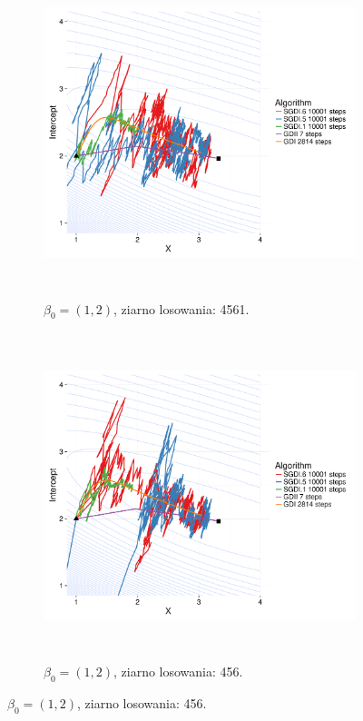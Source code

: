 \begin{figure}[hbt!]
  \begin{center}
   \begin{subfigure}[h!]{0.9\textwidth}
      \includegraphics[width=\textwidth, height=270pt]{Obrazki/Numeryka/sgd_1_2_1.pdf}
      \caption{$\beta_0 = (1,2)$, ziarno losowania: 4561.}
   \end{subfigure}     
   \begin{subfigure}[h!]{0.9\textwidth}
      \includegraphics[width=\textwidth, height=270pt]{Obrazki/Numeryka/sgd_1_2_2.pdf}
      \caption{$\beta_0 = (1,2)$, ziarno losowania: 456.}
   \end{subfigure}  \end{center}

\end{figure}
